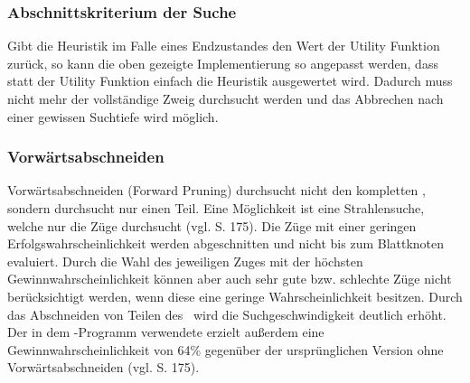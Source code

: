 \subsubsection{Abschnittskriterium der Suche}
\label{ab-depth-limited}
Gibt die Heuristik im Falle eines Endzustandes den Wert der Utility Funktion zurück, so kann die oben gezeigte Implementierung so angepasst werden, dass statt der Utility Funktion einfach die Heuristik ausgewertet wird. Dadurch muss nicht mehr der vollständige Zweig durchsucht werden und das Abbrechen nach einer gewissen Suchtiefe wird möglich.
 
\subsubsection{Vorwärtsabschneiden}
Vorwärtsabschneiden (Forward Pruning) durchsucht nicht den kompletten \gtree , sondern durchsucht nur einen Teil. Eine Möglichkeit ist eine Strahlensuche, welche nur die  Züge durchsucht (vgl. \cite{Russell.2016} S. 175). Die Züge mit einer geringen Erfolgswahrscheinlichkeit werden abgeschnitten und nicht bis zum Blattknoten evaluiert. Durch die Wahl des jeweiligen Zuges mit der höchsten Gewinnwahrscheinlichkeit können aber auch sehr gute bzw. schlechte Züge nicht berücksichtigt werden, wenn diese eine geringe Wahrscheinlichkeit besitzen. Durch das Abschneiden von Teilen des \gtree\ wird die Suchgeschwindigkeit deutlich erhöht. Der in dem \ot -Programm  verwendete  erzielt außerdem eine Gewinnwahrscheinlichkeit von 64\% gegenüber der ursprünglichen Version ohne Vorwärtsabschneiden (vgl. \cite{Russell.2016} S. 175).
